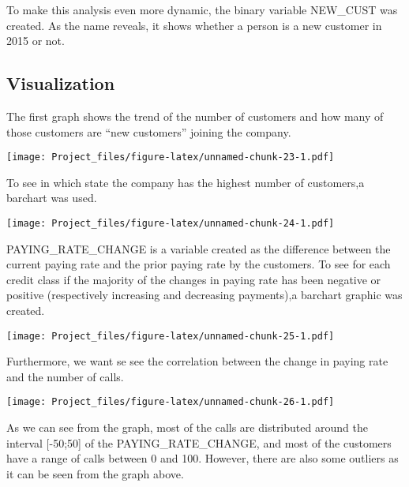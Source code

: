 \documentclass[]{article}
\newenvironment{Shaded}{\begin{snugshade}}{\end{snugshade}}
\newcommand{\KeywordTok}[1]{\textcolor[rgb]{0.13,0.29,0.53}{\textbf{#1}}}
\newcommand{\DecValTok}[1]{\textcolor[rgb]{0.00,0.00,0.81}{#1}}
\newcommand{\StringTok}[1]{\textcolor[rgb]{0.31,0.60,0.02}{#1}}
\newcommand{\OperatorTok}[1]{\textcolor[rgb]{0.81,0.36,0.00}{\textbf{#1}}}
\newcommand{\NormalTok}[1]{#1}
\begin{document}
To make this analysis even more dynamic, the binary variable NEW\_CUST
was created. As the name reveals, it shows whether a person is a new
customer in 2015 or not.

\begin{Shaded}
\end{Shaded}

\subsection{Visualization}\label{visualization}

The first graph shows the trend of the number of customers and how many
of those customers are ``new customers'' joining the company.

\texttt{[image: Project\_files/figure-latex/unnamed-chunk-23-1.pdf]}

To see in which state the company has the highest number of customers,a
barchart was used.

\texttt{[image: Project\_files/figure-latex/unnamed-chunk-24-1.pdf]}

PAYING\_RATE\_CHANGE is a variable created as the difference between the
current paying rate and the prior paying rate by the customers. To see
for each credit class if the majority of the changes in paying rate has
been negative or positive (respectively increasing and decreasing
payments),a barchart graphic was created.

\texttt{[image: Project\_files/figure-latex/unnamed-chunk-25-1.pdf]}

Furthermore, we want se see the correlation between the change in paying
rate and the number of calls.

\texttt{[image: Project\_files/figure-latex/unnamed-chunk-26-1.pdf]}

As we can see from the graph, most of the calls are distributed around
the interval {[}-50;50{]} of the PAYING\_RATE\_CHANGE, and most of the
customers have a range of calls between 0 and 100. However, there are
also some outliers as it can be seen from the graph above.
\end{document}
